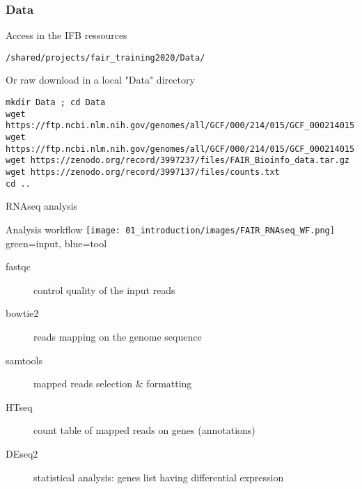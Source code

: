 \begin{frame}[containsverbatim]
\frametitle{Data}
\begin{exampleblock}{Access in the IFB ressources}
\begin{lstlisting}
/shared/projects/fair_training2020/Data/
\end{lstlisting}
\end{exampleblock}
\begin{exampleblock}{Or raw download in a local "Data" directory}
\begin{lstlisting}
mkdir Data ; cd Data
wget https://ftp.ncbi.nlm.nih.gov/genomes/all/GCF/000/214/015/GCF_000214015.3_version_140606/GCF_000214015.3_version_140606_genomic.fna.gz
wget https://ftp.ncbi.nlm.nih.gov/genomes/all/GCF/000/214/015/GCF_000214015.3_version_140606/GCF_000214015.3_version_140606_genomic.gff.gz
wget https://zenodo.org/record/3997237/files/FAIR_Bioinfo_data.tar.gz
wget https://zenodo.org/record/3997137/files/counts.txt
cd ..
\end{lstlisting}
\end{exampleblock}
\end{frame}
\begin{frame}[label=RNAseqWF_diapo]{RNAseq analysis}
\begin{block}{Analysis workflow}
    \texttt{[image: 01\_introduction/images/FAIR\_RNAseq\_WF.png]}\\
green=input, blue=tool
\end{block}
\footnotesize{
\begin{description}
    \item[fastqc] control quality of the input reads
    \item[bowtie2] reads mapping on the genome sequence
    \item[samtools] mapped reads selection $\&$ formatting
    \item[HTseq] count table of mapped reads on genes (annotations)
    \item[DEseq2] statistical analysis: genes list having differential expression
\end{description}
}
\end{frame}
